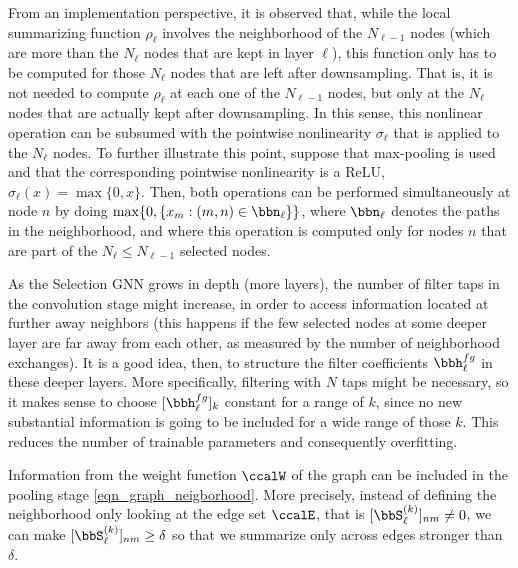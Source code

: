  From an implementation perspective, it is observed that, while the local summarizing function $\rho_{\ell}$ involves the neighborhood of the $N_{\ell-1}$ nodes (which are more than the $N_{\ell}$ nodes that are kept in layer $\ell$), this function only has to be computed for those $N_{\ell}$ nodes that are left after downsampling. That is, it is not needed to compute $\rho_{\ell}$ at each one of the $N_{\ell-1}$ nodes, but only at the $N_{\ell}$ nodes that are actually kept after downsampling. In this sense, this nonlinear operation can be subsumed with the pointwise nonlinearity $\sigma_{\ell}$ that is applied to the $N_{\ell}$ nodes. To further illustrate this point, suppose that max-pooling is used and that the corresponding pointwise nonlinearity is a ReLU, $\sigma_{\ell}(x) = \max\{0,x\}$. Then, both operations can be performed simultaneously at node $n$ by doing $\max\{0,\{x_{m} : (m,n) \in \bbn_{\ell}\}\}$, where $\bbn_{\ell}$ denotes the paths in the neighborhood, and where this operation is computed only for nodes $n$ that are part of the $N_{\ell}\leq N_{\ell-1}$ selected nodes.

 As the Selection GNN grows in depth (more layers), the number of filter taps in the convolution stage might increase, in order to access information located at further away neighbors (this happens if the few selected nodes at some deeper layer are far away from each other, as measured by the number of neighborhood exchanges). It is a good idea, then, to structure the filter coefficients $\bbh_{\ell}^{fg}$ in these deeper layers. More specifically, filtering with $N$ taps might be necessary, so it makes sense to choose $[\bbh_{\ell}^{fg}]_k$ constant for a range of $k$, since no new substantial information is going to be included for a wide range of those $k$. This reduces the number of trainable parameters and consequently overfitting.

 Information from the weight function $\ccalW$ of the graph can be included in the pooling stage \eqref{eqn_graph_neigborhood}. More precisely, instead of defining the neighborhood only looking at the edge set $\ccalE$, that is $[\bbS_{\ell}^{(k)}]_{nm} \neq 0$, we can make $[\bbS_{\ell}^{(k)}]_{nm} \geq \delta$ so that we summarize only across edges stronger than $\delta$.

